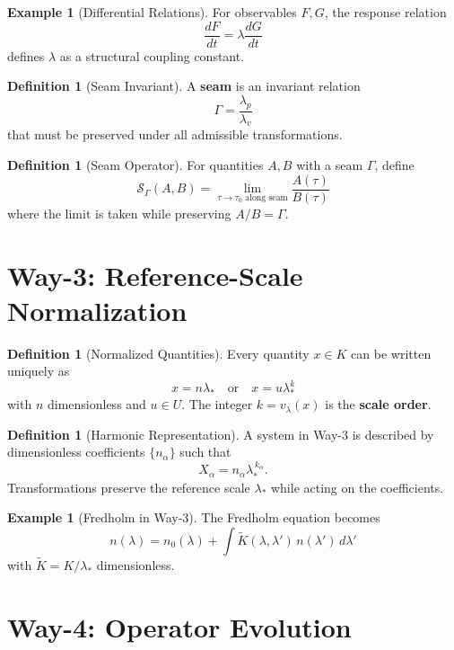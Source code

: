 \documentclass[12pt, reqno]{amsart}
\theoremstyle{plain}
\theoremstyle{definition}
\newtheorem{definition}[theorem]{Definition}
\newtheorem{example}[theorem]{Example}
\theoremstyle{remark}
\newcommand{\lstar}{\lambda_{*}}
\newcommand{\val}{v_{\lambda}}
\newcommand{\unit}{U}
\newcommand{\seam}{\Gamma}
\newcommand{\seamop}{\mathcal{S}_{\seam}}
\begin{document}
\begin{example}[Differential Relations]
For observables $F,G$, the response relation
\[
\frac{dF}{dt} = \lambda \frac{dG}{dt}
\]
defines $\lambda$ as a structural coupling constant.
\end{example}

\begin{definition}[Seam Invariant]
A \textbf{seam} is an invariant relation
\[
\seam = \frac{\lambda_p}{\lambda_v}
\]
that must be preserved under all admissible transformations.
\end{definition}

\begin{definition}[Seam Operator]
For quantities $A,B$ with a seam $\seam$, define
\[
\seamop(A,B) = \lim_{\tau \to \tau_0 \text{ along seam}} \frac{A(\tau)}{B(\tau)}
\]
where the limit is taken while preserving $A/B = \seam$.
\end{definition}

\section{Way-3: Reference-Scale Normalization}

\begin{definition}[Normalized Quantities]
Every quantity $x \in K$ can be written uniquely as
\[
x = n\lstar \quad \text{or} \quad x = u\lstar^{k}
\]
with $n$ dimensionless and $u \in \unit$. The integer $k = \val(x)$ is the \textbf{scale order}.
\end{definition}

\begin{definition}[Harmonic Representation]
A system in Way-3 is described by dimensionless coefficients $\{n_{\alpha}\}$ such that
\[
X_{\alpha} = n_{\alpha}\lstar^{\,k_{\alpha}}.
\]
Transformations preserve the reference scale $\lstar$ while acting on the coefficients.
\end{definition}

\begin{example}[Fredholm in Way-3]
The Fredholm equation becomes
\[
n(\lambda) = n_0(\lambda) + \int \widetilde{K}(\lambda,\lambda')\, n(\lambda')\, d\lambda'
\]
with $\widetilde{K} = K/\lstar$ dimensionless.
\end{example}

\section{Way-4: Operator Evolution}
\end{document}
